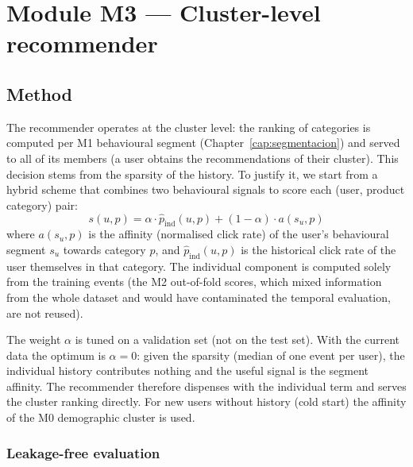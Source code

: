 \chapter{Module M3 — Cluster-level recommender}
\label{cap:recomendador}

\section{Method}

The recommender operates at the cluster level: the ranking of categories is computed per M1 behavioural segment (Chapter~\ref{cap:segmentacion}) and served to all of its members (a user obtains the recommendations of their cluster). This decision stems from the sparsity of the history. To justify it, we start from a hybrid scheme that combines two behavioural signals to score each (user, product category) pair:
\begin{equation}
    s(u, p) = \alpha \cdot \hat{p}_\text{ind}(u, p) + (1-\alpha) \cdot a(s_u, p)
    \label{eq:hybrid}
\end{equation}
where $a(s_u, p)$ is the affinity (normalised click rate) of the user's behavioural segment $s_u$ towards category $p$, and $\hat{p}_\text{ind}(u, p)$ is the historical click rate of the user themselves in that category. The individual component is computed solely from the training events (the M2 out-of-fold scores, which mixed information from the whole dataset and would have contaminated the temporal evaluation, are not reused).

The weight $\alpha$ is tuned on a validation set (not on the test set). With the current data the optimum is $\alpha=0$: given the sparsity (median of one event per user), the individual history contributes nothing and the useful signal is the segment affinity. The recommender therefore dispenses with the individual term and serves the cluster ranking directly. For new users without history (cold start) the affinity of the M0 demographic cluster is used.

\subsection*{Leakage-free evaluation}

